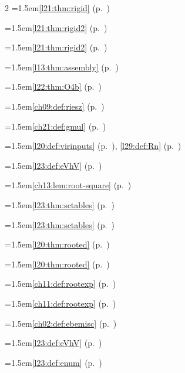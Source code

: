 \begin{multicols}{2}
\hangindent=1.5em\quad \ref{l21:thm:rigid} (p.~\pageref{l21:thm:rigid})\par
\hangindent=1.5em\quad \ref{l21:thm:rigid2} (p.~\pageref{l21:thm:rigid2})\par
\hangindent=1.5em\quad \ref{l21:thm:rigid2} (p.~\pageref{l21:thm:rigid2})\par
\hangindent=1.5em\quad \ref{l13:thm:assembly} (p.~\pageref{l13:thm:assembly})\par
\hangindent=1.5em\quad \ref{l22:thm:O4b} (p.~\pageref{l22:thm:O4b})\par
\hangindent=1.5em\quad \ref{ch09:def:riesz} (p.~\pageref{ch09:def:riesz})\par
\hangindent=1.5em\quad \ref{ch21:def:gmul} (p.~\pageref{ch21:def:gmul})\par
\hangindent=1.5em\quad \ref{l20:def:virinputs} (p.~\pageref{l20:def:virinputs}), \ref{l29:def:Rn} (p.~\pageref{l29:def:Rn})\par
\hangindent=1.5em\quad \ref{l23:def:eVhV} (p.~\pageref{l23:def:eVhV})\par
\hangindent=1.5em\quad \ref{ch13:lem:root-square} (p.~\pageref{ch13:lem:root-square})\par
\hangindent=1.5em\quad \ref{l23:thm:sctables} (p.~\pageref{l23:thm:sctables})\par
\hangindent=1.5em\quad \ref{l23:thm:sctables} (p.~\pageref{l23:thm:sctables})\par
\hangindent=1.5em\quad \ref{l20:thm:rooted} (p.~\pageref{l20:thm:rooted})\par
\hangindent=1.5em\quad \ref{l20:thm:rooted} (p.~\pageref{l20:thm:rooted})\par
\hangindent=1.5em\quad \ref{ch11:def:rootexp} (p.~\pageref{ch11:def:rootexp})\par
\hangindent=1.5em\quad \ref{ch11:def:rootexp} (p.~\pageref{ch11:def:rootexp})\par
\hangindent=1.5em\quad \ref{ch02:def:ebemisc} (p.~\pageref{ch02:def:ebemisc})\par
\hangindent=1.5em\quad \ref{l23:def:eVhV} (p.~\pageref{l23:def:eVhV})\par
\hangindent=1.5em\quad \ref{l23:def:enum} (p.~\pageref{l23:def:enum})\par

\end{multicols}
